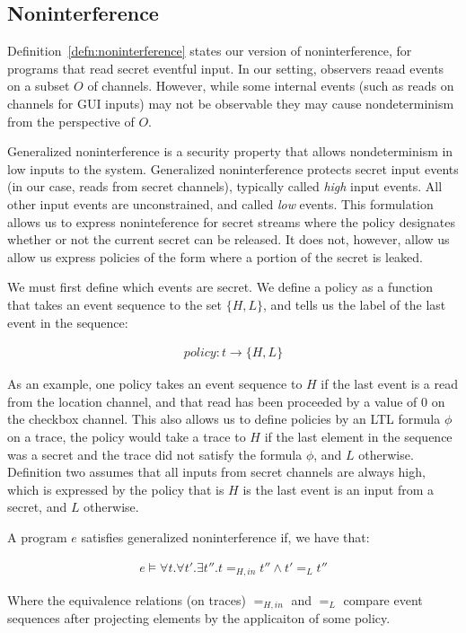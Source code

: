 \documentclass[conference]{IEEEtran}
\theoremstyle{definition}
\newcommand{\prin}{\textit{O}}
\newcommand{\tr}{t\xspace}
\begin{document}
\subsection{Noninterference}

Definition~\ref{defn:noninterference} states our version of
noninterference, for programs that read secret eventful input.  In our
setting, observers reaad events on a subset $\prin$ of channels.
However, while some internal events (such as reads on channels for GUI
inputs) may not be observable they may cause nondeterminism from the
perspective of $\prin$.

Generalized noninterference \cite{} is a security property that allows
nondeterminism in low inputs to the system.  Generalized
noninterference protects secret input events (in our case, reads from
secret channels), typically called \emph{high} input events.  All
other input events are unconstrained, and called \emph{low} events.
This formulation allows us to express noninteference for secret
streams where the policy designates whether or not the current secret
can be released.  It does not, however, allow us allow us express
policies of the form where a portion of the secret is leaked.

We must first define which events are secret.  We define a policy as a
function that takes an event sequence to the set $\{H,L\}$, and tells
us the label of the last event in the sequence:

\begin{displaymath}
  \begin{array}{c}
    policy : \tr \rightarrow \{H,L\}
  \end{array}
\end{displaymath}

As an example, one policy takes an event sequence to $H$ if the last
event is a read from the location channel, and that read has been
proceeded by a value of $0$ on the checkbox channel.  This also allows
us to define policies by an LTL formula $\phi$ on a trace, the policy
would take a trace to $H$ if the last element in the sequence was a
secret and the trace did not satisfy the formula $\phi$, and $L$
otherwise.  Definition two assumes that all inputs from secret
channels are always high, which is expressed by the policy that is $H$
is the last event is an input from a secret, and $L$ otherwise.

\begin{Definition}
  A program $e$ satisfies generalized noninterference if, we have
  that:

  \begin{displaymath}
    \begin{array}{l}
      e \models \forall \tr. \forall \tr'. \exists \tr''. \tr =_{H,in}
      \tr'' \land \tr' =_L \tr''
    \end{array}
  \end{displaymath}

  Where the equivalence relations (on traces) $=_{H,in}$ and $=_L$
  compare event sequences after projecting elements by the applicaiton
  of some policy.
\end{Definition}
\end{document}
